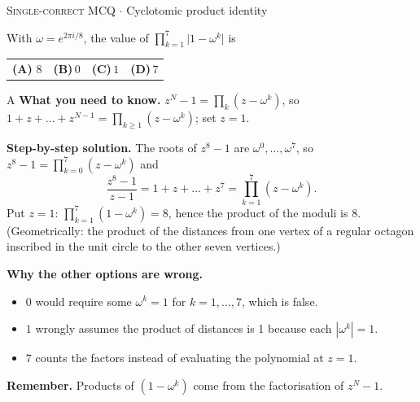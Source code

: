\documentclass[11pt,a4paper]{article}
\newcommand{\optlabel}[1]{\textbf{(#1)}}
\newcommand{\correctlabel}[1]{\textcolor{okgreen}{\textbf{(#1)}\,\ding{51}}}
\newenvironment{qitem}[1]{\begin{list}{}{\setlength{\leftmargin}{3.3em}\setlength{\labelwidth}{3.1em}%
  \setlength{\labelsep}{0.2em}\setlength{\topsep}{3pt}\setlength{\parsep}{3pt}}\item[\textbf{Q.#1}\hfill]}{\end{list}}
\newcommand{\qsep}{\par\vspace{2pt}{\color{black!15}\hrule}\vspace{4pt}}
\newcommand{\qmeta}[2]{{\footnotesize\color{black!60}\textsc{#1} \;$\cdot$\; #2}\par}
\begin{document}
\begin{qitem}{12}
\qmeta{Single-correct MCQ}{Cyclotomic product identity}
With $\omega = e^{2\pi i/8}$, the value of $\displaystyle\prod_{k=1}^{7}\big|1 - \omega^{k}\big|$ is
\par\smallskip\noindent\begin{tabularx}{\linewidth}{@{}*{4}{L}@{}}
\correctlabel{A}\,$8$ & \optlabel{B}\,$0$ & \optlabel{C}\,$1$ & \optlabel{D}\,$7$
\end{tabularx}
\end{qitem}
\begin{solbox}{A}
\textbf{\color{brand}What you need to know.} $z^N - 1 = \prod_k(z - \omega^k)$, so $1 + z + \dots + z^{N-1} = \prod_{k\ge1}(z - \omega^k)$; set $z = 1$.

\textbf{\color{brand}Step-by-step solution.} The roots of $z^8 - 1$ are $\omega^0, \dots, \omega^7$, so $z^8 - 1 = \prod_{k=0}^{7}(z - \omega^k)$ and
\[ \frac{z^8-1}{z-1} = 1 + z + \dots + z^7 = \prod_{k=1}^{7}(z - \omega^k). \]
Put $z = 1$: $\prod_{k=1}^{7}(1-\omega^k) = 8$, hence the product of the moduli is $8$. (Geometrically: the product of the
distances from one vertex of a regular octagon inscribed in the unit circle to the other seven vertices.)

\textbf{\color{brand}Why the other options are wrong.}
\begin{itemize}[leftmargin=2.4em, itemsep=1pt, topsep=2pt]
\item[\textbf{(B)}] $0$ would require some $\omega^k = 1$ for $k = 1, \dots, 7$, which is false.
\item[\textbf{(C)}] $1$ wrongly assumes the product of distances is 1 because each $|\omega^k| = 1$.
\item[\textbf{(D)}] $7$ counts the factors instead of evaluating the polynomial at $z = 1$.
\end{itemize}
\textbf{\color{brand}Remember.} Products of $(1 - \omega^k)$ come from the factorisation of $z^N - 1$.
\end{solbox}
\qsep
\end{document}
